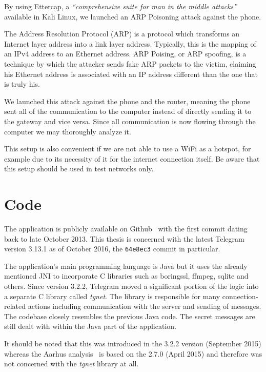 \documentclass[thesis=M,english]{FITthesis}[2012/10/20]
\begin{document}
By using Ettercap, a \emph{``comprehensive suite for man in the middle attacks''}~\cite{ettercap-homepage} available in Kali Linux, we launched an ARP Poisoning attack against the phone.

The Address Resolution Protocol (ARP) is a protocol which transforms an Internet layer address into a link layer address. Typically, this is the mapping of an IPv4 address to an Ethernet address. ARP Poising, or ARP spoofing, is a technique by which the attacker sends fake ARP packets to the victim, claiming his Ethernet address is associated with an IP address different than the one that is truly his.

We launched this attack against the phone and the router, meaning the phone sent all of the communication to the computer instead of directly sending it to the gateway and vice versa. Since all communication is now flowing through the computer we may thoroughly analyze it.

This setup is also convenient if we are not able to use a WiFi as a hotspot, for example due to its necessity of it for the internet connection itself. Be aware that this setup should be used in test networks only.

\section{Code}

The application is publicly available on Github~\cite{github-telegram} with the first commit dating back to late October 2013. This thesis is concerned with the latest Telegram version 3.13.1 as of October 2016, the \texttt{64e8ec3} commit in particular.

The application's main programming language is Java but it uses the already mentioned JNI to incorporate C libraries such as boringssl, ffmpeg, sqlite and others. Since version 3.2.2, Telegram moved a significant portion of the logic into a separate C library called \emph{tgnet}. The library is responsible for many connection-related actions including communication with the server and sending of messages. The codebase closely resembles the previous Java code. The secret messages are still dealt with within the Java part of the application.

It should be noted that this was introduced in the 3.2.2 version (September 2015) whereas the Aarhus analysis~\cite{telegram-aarhus} is based on the 2.7.0 (April 2015) and therefore was not concerned with the \emph{tgnet} library at all.
\end{document}
